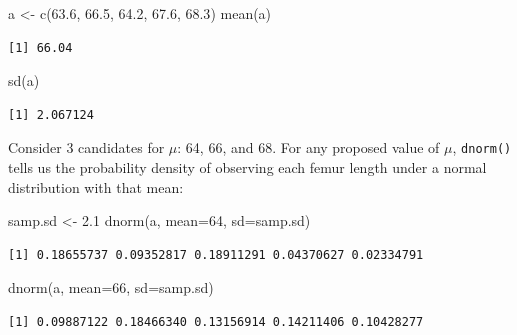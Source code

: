 \documentclass[
  13,
  letterpaper,
]{report}
\newenvironment{Shaded}{\begin{snugshade}}{\end{snugshade}}
\newcommand{\AttributeTok}[1]{\textcolor[rgb]{0.40,0.45,0.13}{#1}}
\newcommand{\DecValTok}[1]{\textcolor[rgb]{0.68,0.00,0.00}{#1}}
\newcommand{\FloatTok}[1]{\textcolor[rgb]{0.68,0.00,0.00}{#1}}
\newcommand{\FunctionTok}[1]{\textcolor[rgb]{0.28,0.35,0.67}{#1}}
\newcommand{\NormalTok}[1]{\textcolor[rgb]{0.00,0.23,0.31}{#1}}
\newcommand{\OtherTok}[1]{\textcolor[rgb]{0.00,0.23,0.31}{#1}}
\begin{document}
\begin{Shaded}
\begin{Highlighting}[]
\NormalTok{a }\OtherTok{\textless{}{-}} \FunctionTok{c}\NormalTok{(}\FloatTok{63.6}\NormalTok{, }\FloatTok{66.5}\NormalTok{, }\FloatTok{64.2}\NormalTok{, }\FloatTok{67.6}\NormalTok{, }\FloatTok{68.3}\NormalTok{)}
\FunctionTok{mean}\NormalTok{(a)}
\end{Highlighting}
\end{Shaded}

\begin{verbatim}
[1] 66.04
\end{verbatim}

\begin{Shaded}
\begin{Highlighting}[]
\FunctionTok{sd}\NormalTok{(a)}
\end{Highlighting}
\end{Shaded}

\begin{verbatim}
[1] 2.067124
\end{verbatim}

Consider 3 candidates for \(\mu\): 64, 66, and 68. For any proposed
value of \(\mu\), \texttt{dnorm()} tells us the probability density of
observing each femur length under a normal distribution with that mean:

\begin{Shaded}
\begin{Highlighting}[]
\NormalTok{samp.sd }\OtherTok{\textless{}{-}} \FloatTok{2.1}
\FunctionTok{dnorm}\NormalTok{(a, }\AttributeTok{mean=}\DecValTok{64}\NormalTok{, }\AttributeTok{sd=}\NormalTok{samp.sd)}
\end{Highlighting}
\end{Shaded}

\begin{verbatim}
[1] 0.18655737 0.09352817 0.18911291 0.04370627 0.02334791
\end{verbatim}

\begin{Shaded}
\begin{Highlighting}[]
\FunctionTok{dnorm}\NormalTok{(a, }\AttributeTok{mean=}\DecValTok{66}\NormalTok{, }\AttributeTok{sd=}\NormalTok{samp.sd)}
\end{Highlighting}
\end{Shaded}

\begin{verbatim}
[1] 0.09887122 0.18466340 0.13156914 0.14211406 0.10428277
\end{verbatim}
\end{document}
